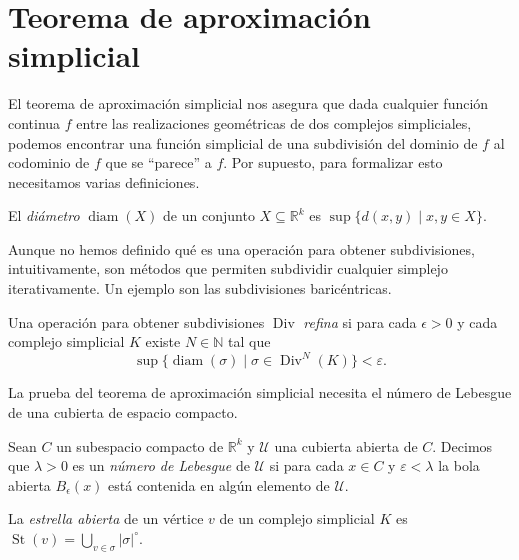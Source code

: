 \documentclass{standalone}
\begin{document}
	\section{Teorema de aproximación simplicial}
	
	El teorema de aproximación simplicial nos asegura que dada cualquier función continua $f$ entre las realizaciones geométricas de dos complejos simpliciales,  podemos encontrar una función simplicial de una subdivisión del dominio de $f$ al codominio de $f$ que se ``parece'' a $f$. Por supuesto, para formalizar esto necesitamos varias definiciones.
	
	\begin{definition}\label{def:diameter}
		El \emph{diámetro} $\operatorname{diam}(X)$ de un conjunto $X\subseteq\mathbb{R}^{k}$ es $\sup\{d(x,y)\mid x,y\in X\}$.
	\end{definition}
	
	Aunque no hemos definido qué es una operación para obtener subdivisiones, intuitivamente, son métodos que permiten subdividir cualquier simplejo iterativamente. Un ejemplo son las subdivisiones baricéntricas.
	
	\begin{definition}\label{def:mesh}
		Una operación para obtener subdivisiones $\operatorname{Div}$ \emph{refina} si para cada $\epsilon>0$ y cada complejo simplicial $K$ existe $N\in\mathbb{N}$ tal que \[\sup\{\operatorname{diam}(\sigma)\mid\sigma\in\operatorname{Div}^{N}(K)\}<\varepsilon.\]
	\end{definition}
	La prueba del teorema de aproximación simplicial necesita el número de Lebesgue de una cubierta de espacio compacto.
	
	\begin{definition}\label{def:lebesgue}
		Sean $C$ un subespacio compacto de $\mathbb{R}^{k}$ y $\mathcal{U}$ una cubierta abierta de $C$. Decimos que $\lambda>0$ es un \emph{número de Lebesgue} de $\mathcal{U}$ si para cada $x\in C$ y $\varepsilon<\lambda$ la bola abierta $B_{\epsilon}(x)$ está contenida en algún elemento de $\mathcal{U}$.
	\end{definition}
	
	\begin{definition}
		La \emph{estrella abierta} de un vértice $v$ de un complejo simplicial $K$ es $\operatorname{St}(v)=\bigcup_{v\in\sigma}|\sigma|^{\circ}$.
	\end{definition}
	
\end{document}

